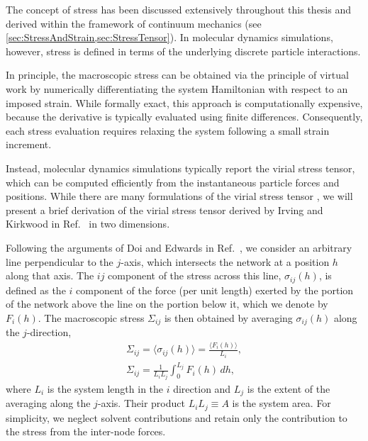 The concept of stress has been discussed extensively throughout this thesis and derived within the framework of continuum mechanics (see \cref{sec:StressAndStrain,sec:StressTensor}). In molecular dynamics simulations, however, stress is defined in terms of the underlying discrete particle interactions.

In principle, the macroscopic stress can be obtained via the principle of virtual work by numerically differentiating the system Hamiltonian with respect to an imposed strain. While formally exact, this approach is computationally expensive, because the derivative is typically evaluated using finite differences. Consequently, each stress evaluation requires relaxing the system following a small strain increment.

Instead, molecular dynamics simulations typically report the virial stress tensor, which can be computed efficiently from the instantaneous particle forces and positions. While there are many formulations of the virial stress tensor \cite{walton_pressure_1983,erpenbeck_einstein-kubo-helfand_1995,tsai_virial_1979}, we will present a brief derivation of the virial stress tensor derived by Irving and Kirkwood in Ref.~\cite{irving_statistical_1950} in two dimensions.


Following the arguments of Doi and Edwards in Ref.~\cite{doi_theory_1988}, we consider an arbitrary line perpendicular to the $j$-axis, which intersects the network at a position $h$ along that axis. The $ij$ component of the stress across this line, $\sigma_{ij}(h)$, is defined as the $i$ component of the force (per unit length) exerted by the portion of the network above the line on the portion below it, which we denote by $F_i(h)$. The macroscopic stress $\Sigma_{ij}$ is then obtained by averaging $\sigma_{ij}(h)$ along the $j$-direction,
\begin{gather}
    \Sigma_{ij} = \langle \sigma_{ij}(h) \rangle = \frac{\langle F_i(h) \rangle}{L_i}, \\
    \Sigma_{ij} = \frac{1}{L_i L_j}\int_0^{L_j} F_i(h)\, dh,
    \label{eq:virialDevInt}
\end{gather}
where $L_i$ is the system length in the $i$ direction and $L_j$ is the extent of the averaging along the $j$-axis.  Their product $L_iL_j \equiv A$ is the system area. For simplicity, we neglect solvent contributions and retain only the contribution to the stress from the inter-node forces.
 
